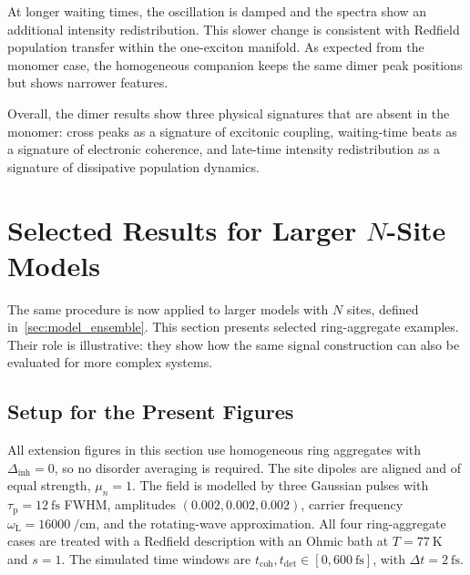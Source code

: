 At longer waiting times, the oscillation is damped and the spectra show an additional intensity redistribution. This slower change is consistent with Redfield population transfer within the one-exciton manifold. As expected from the monomer case, the homogeneous companion keeps the same dimer peak positions but shows narrower features.

Overall, the dimer results show three physical signatures that are absent in the monomer: cross peaks as a signature of excitonic coupling, waiting-time beats as a signature of electronic coherence, and late-time intensity redistribution as a signature of dissipative population dynamics.


\section{Selected Results for Larger \texorpdfstring{$N$}{N}-Site Models}
\label{sec:results_nsite_extension}

The same procedure is now applied to larger models with \(N\) sites, defined in~\autoref{sec:model_ensemble}. This section presents selected ring-aggregate examples. Their role is illustrative: they show how the same signal construction can also be evaluated for more complex systems.

\subsection{Setup for the Present Figures}
\label{subsec:results_nsite_model}

All extension figures in this section use homogeneous ring aggregates with \(\Delta_{\mathrm{inh}}=0\), so no disorder averaging is required. The site dipoles are aligned and of equal strength, \(\mu_n=1\). The field is modelled by three Gaussian pulses with \(\tau_{\mathrm{p}}=\SI{12}{\femto\second}\) FWHM, amplitudes \((0.002,0.002,0.002)\), carrier frequency \(\omega_{\mathrm{L}}=\SI{16000}{\per\centi\metre}\), and the rotating-wave approximation. All four ring-aggregate cases are treated with a Redfield description with an Ohmic bath at \(T=\SI{77}{\kelvin}\) and \(s=1\). The simulated time windows are \(t_{\mathrm{coh}},t_{\mathrm{det}}\in[0,\SI{600}{\femto\second}]\), with \(\Delta t=\SI{2}{\femto\second}\).

